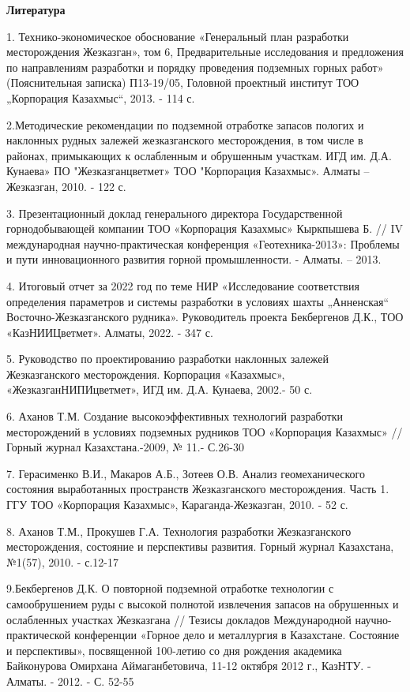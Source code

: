 \begin{center}
{\bfseries Литература}
\end{center}
\begin{references}

1. Технико-экономическое обоснование «Генеральный план разработки
месторождения Жезказган», том 6, Предварительные исследования и
предложения по направлениям разработки и порядку проведения подземных
горных работ» (Пояснительная записка) П13-19/05, Головной проектный
институт ТОО „Корпорация Казахмыс``, 2013. - 114 с.

2.Методические рекомендации по подземной отработке запасов пологих и
наклонных рудных залежей жезказганского месторождения, в том числе в
районах, примыкающих к ослабленным и обрушенным участкам. ИГД им. Д.А.
Кунаева» ПО "Жезказганцветмет» ТОО "Корпорация Казахмыс». Алматы --
Жезказган, 2010. - 122 с.

3. Презентационный доклад генерального директора Государственной
горнодобывающей компании ТОО «Корпорация Казахмыс» Кыркпышева Б. // IV
международная научно-практическая конференция «Геотехника-2013»:
Проблемы и пути инновационного развития горной промышленности. - Алматы.
-- 2013.

4. Итоговый отчет за 2022 год по теме НИР «Исследование соответствия
определения параметров и системы разработки в условиях шахты
„Анненская`` Восточно-Жезказганского рудника». Руководитель проекта
Бекбергенов Д.К., ТОО «КазНИИЦветмет». Алматы, 2022. - 347 с.

5. Руководство по проектированию разработки наклонных залежей
Жезказганского месторождения. Корпорация «Казахмыс»,
«ЖезказганНИПИцветмет», ИГД им. Д.А. Кунаева, 2002.- 50 с.

6. Аханов Т.М. Создание высокоэффективных технологий разработки
месторождений в условиях подземных рудников ТОО «Корпорация Казахмыс» //
Горный журнал Казахстана.-2009, № 11.- С.26-30

7. Герасименко В.И., Макаров А.Б., Зотеев О.В. Анализ геомеханического
состояния выработанных пространств Жезказганского месторождения. Часть
1. ГГУ ТОО «Корпорация Казахмыс», Караганда-Жезказган, 2010. - 52 с.

8. Аханов Т.М., Прокушев Г.А. Технология разработки Жезказганского
месторождения, состояние и перспективы развития. Горный журнал
Казахстана, №1(57), 2010. - с.12-17

9.Бекбергенов Д.К. О повторной подземной отработке технологии с
самообрушением руды с высокой полнотой извлечения запасов на обрушенных
и ослабленных участках Жезказгана // Тезисы докладов Международной
научно-практической конференции «Горное дело и металлургия в Казахстане.
Состояние и перспективы», посвященной 100-летию со дня рождения
академика Байконурова Омирхана Аймаганбетовича, 11-12 октября 2012 г.,
КазНТУ. - Алматы. - 2012. - С. 52-55


\end{references}
